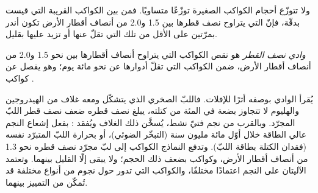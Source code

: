 ولا تتوزّع أحجام الكواكب الصغيرة توزّعًا متساويًا. فمن بين الكواكب القريبة
التي قيست بدقّة، فإنّ التي يتراوح نصف قطرها بين 1.5 و2.0 من أنصاف أقطار الأرض تكون أندر بمرّتين على الأقل
من تلك التي تقلّ عنها أو تزيد عليها بقليل.

\begin{definition}\label{def:b3:exoplanets:radius-valley}
\emph{وادي نصف القطر} هو نقص الكواكب
التي يتراوح أنصاف أقطارها بين نحو 1.5 و2.0 من أنصاف أقطار الأرض، ضمن الكواكب
التي تقلّ أدوارها عن نحو مائة يوم؛ وهو يفصل 
عن كواكب .
\end{definition}

يُقرأ الوادي بوصفه أثرًا للإفلات. فاللبّ الصخري الذي يتشكّل ومعه غلاف
من الهيدروجين والهليوم لا تتجاوز بضعة في المئة من كتلته، يبلغ نصف قطره ضعف نصف قطر اللبّ المجرّد.
وبالقرب من نجم فتيّ نشط، يُسخَّن ذلك الغلاف ويُفقد
: بفعل إشعاع النجم عالي الطاقة خلال
أوّل مائة مليون سنة (التبخّر الضوئي)، أو بحرارة اللبّ المتبرّد نفسه
(فقدان الكتلة
بطاقة اللبّ). وتدفع النماذج الكواكب إلى لبّ مجرّد نصف قطره نحو 1.3 من أنصاف أقطار الأرض،
وكواكب بضعف ذلك الحجم؛ ولا يبقى إلّا القليل بينهما. وتعتمد الآليتان
على النجم اعتمادًا مختلفًا، والكواكب التي تدور حول نجوم من أنواع
مختلفة قد تُمكّن من التمييز بينهما.

